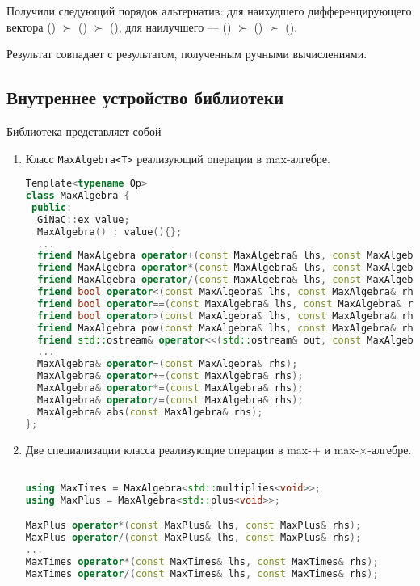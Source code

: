 \documentclass[specialist,
	substylefile = spbu.rtx,
	subf,href,colorlinks=true, 12pt]{disser}
\begin{document}
Получили следующий порядок альтернатив:
для наихудшего дифференцирующего вектора () \(\succ\) () \(\succ\) (),
для наилучшего --- () \(\succ\) () \(\succ\) ().

Результат совпадает с результатом, полученным ручными вычислениями.

\subsection{Внутреннее устройство библиотеки}
Библиотека представляет собой
\begin{enumerate}
	\item Класс \texttt{MaxAlgebra<T>} реализующий операции в max-алгебре.

\begin{lstlisting}[language=C++,basicstyle=\footnotesize\ttfamily,keywordstyle=\color{blue}]
Template<typename Op>
class MaxAlgebra {
 public:
  GiNaC::ex value;
  MaxAlgebra() : value(){};
  ...
  friend MaxAlgebra operator+(const MaxAlgebra& lhs, const MaxAlgebra& rhs);
  friend MaxAlgebra operator*(const MaxAlgebra& lhs, const MaxAlgebra& rhs);
  friend MaxAlgebra operator/(const MaxAlgebra& lhs, const MaxAlgebra& rhs);
  friend bool operator<(const MaxAlgebra& lhs, const MaxAlgebra& rhs);
  friend bool operator==(const MaxAlgebra& lhs, const MaxAlgebra& rhs);
  friend bool operator>(const MaxAlgebra& lhs, const MaxAlgebra& rhs);
  friend MaxAlgebra pow(const MaxAlgebra& lhs, const MaxAlgebra& rhs);
  friend std::ostream& operator<<(std::ostream& out, const MaxAlgebra& val);
  ...
  MaxAlgebra& operator=(const MaxAlgebra& rhs);
  MaxAlgebra& operator+=(const MaxAlgebra& rhs);
  MaxAlgebra& operator*=(const MaxAlgebra& rhs);
  MaxAlgebra& operator/=(const MaxAlgebra& rhs);
  MaxAlgebra& abs(const MaxAlgebra& rhs);
};
\end{lstlisting}
\end{enumerate}

\begin{enumerate}
 \setcounter{enumi}{1}
	\item Две специализации класса реализующие операции в max-+ и max-$\times$-алгебре.
\begin{lstlisting}[language=C++,basicstyle=\footnotesize\ttfamily,keywordstyle=\color{blue}]

using MaxTimes = MaxAlgebra<std::multiplies<void>>;
using MaxPlus = MaxAlgebra<std::plus<void>>;

MaxPlus operator*(const MaxPlus& lhs, const MaxPlus& rhs);
MaxPlus operator/(const MaxPlus& lhs, const MaxPlus& rhs);
...
MaxTimes operator*(const MaxTimes& lhs, const MaxTimes& rhs);
MaxTimes operator/(const MaxTimes& lhs, const MaxTimes& rhs);
\end{lstlisting}
\end{enumerate}
\end{document}
